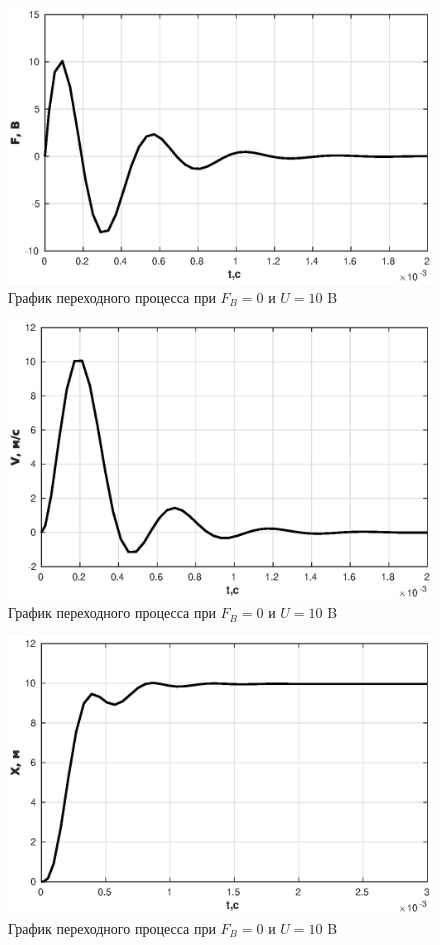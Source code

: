 \documentclass[12pt, a4paper]{article}
\begin{document}
\begin{figure}[H]
\centering
\includegraphics[width = \textwidth]{1/F1.eps}
\caption{График переходного процесса при  $F_B = 0$ и $U = 10$ B }
\end{figure}

\begin{figure}[H]
\centering
\includegraphics[width = \textwidth]{1/V1.eps}
\caption{График переходного процесса при  $F_B = 0$ и $U = 10$ B }
\end{figure}

\begin{figure}[H]
\centering
\includegraphics[width = \textwidth]{1/X1.eps}
\caption{График переходного процесса при  $F_B = 0$ и $U = 10$ B }
\end{figure}
\end{document}
